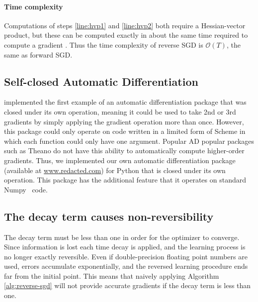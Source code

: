 \documentclass{article}
\begin{document}
\paragraph{Time complexity}
Computations of steps \ref{line:hvp1} and \ref{line:hvp2} both require a Hessian-vector product, but these can be computed exactly in about the same time required to compute a gradient \citep{pearlmutter1994fast}.
Thus the time complexity of reverse SGD is $\mathcal{O}(T)$, the same as forward SGD.

\subsection{Self-closed Automatic Differentiation}
\citet{pearlmutter2008reverse} implemented the first example of an automatic differentiation package that was closed under its own operation, meaning it could be used to take 2nd or 3rd gradients by simply applying the gradient operation more than once.
However, this package could only operate on code written in a limited form of Scheme in which each function could only have one argument.
Popular AD popular packages such as Theano do not have this ability to automatically compute higher-order gradients.
Thus, we implemented our own automatic differentiation package (available at \url{www.redacted.com}) for Python that is closed under its own operation.
This package has the additional feature that it operates on standard Numpy~\cite{oliphant2007python} code.

\subsection{The decay term causes non-reversibility}
The decay term must be less than one in order for the optimizer to converge.
Since information is lost each time decay is applied, and the learning process is no longer exactly reversible.
Even if double-precision floating point numbers are used, errors accumulate exponentially, and the reversed learning procedure ends far from the initial point.
This means that naively applying Algorithm \ref{alg:reverse-sgd} will not provide accurate gradients if the decay term is less than one.
\end{document}

